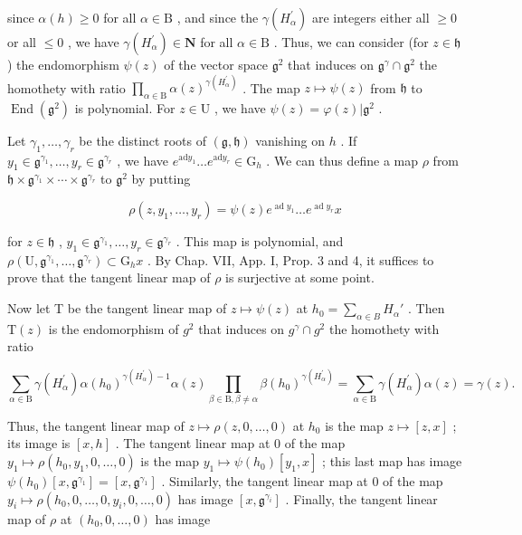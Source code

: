 since \(\alpha(h) \geq 0\) for all \(\alpha \in \mathrm{B}\) , and since the \(\gamma(H_{\alpha}^{\prime})\) are integers either all \(\geq 0\) or all \(\leq 0\) , we have \(\gamma(H_{\alpha}^{\prime}) \in \mathbf{N}\) for all \(\alpha \in \mathrm{B}\) . Thus, we can consider (for \(z \in \mathfrak{h}\) ) the endomorphism \(\psi(z)\) of the vector space \(\mathfrak{g}^2\) that induces on \(\mathfrak{g}^{\gamma} \cap \mathfrak{g}^2\) the homothety with ratio \(\prod_{\alpha \in \mathrm{B}} \alpha(z)^{\gamma(H_{\alpha}^{\prime})}\) . The map \(z \mapsto \psi(z)\) from \(\mathfrak{h}\) to \(\operatorname{End}(\mathfrak{g}^2)\) is polynomial. For \(z \in \mathrm{U}\) , we have \(\psi(z) = \varphi(z)|\mathfrak{g}^2\) .

Let \(\gamma_1, \ldots, \gamma_r\) be the distinct roots of \((\mathfrak{g}, \mathfrak{h})\) vanishing on \(h\) . If \(y_1 \in \mathfrak{g}^{\gamma_1}, \ldots, y_r \in \mathfrak{g}^{\gamma_r}\) , we have \(e^{\mathrm{ad} y_1} \ldots e^{\mathrm{ad} y_r} \in \mathrm{G}_h\) . We can thus define a map \(\rho\) from \(\mathfrak{h} \times \mathfrak{g}^{\gamma_1} \times \cdots \times \mathfrak{g}^{\gamma_r}\) to \(\mathfrak{g}^2\) by putting

\[
\rho (z, y _ {1}, \dots , y _ {r}) = \psi (z) e ^ {\operatorname{ad} y _ {1}} \dots e ^ {\operatorname{ad} y _ {r}} x
\]

for \(z \in \mathfrak{h}\) , \(y_1 \in \mathfrak{g}^{\gamma_1}, \ldots, y_r \in \mathfrak{g}^{\gamma_r}\) . This map is polynomial, and \(\rho(\mathrm{U}, \mathfrak{g}^{\gamma_1}, \ldots, \mathfrak{g}^{\gamma_r}) \subset \mathrm{G}_h x\) . By Chap. VII, App. I, Prop. 3 and 4, it suffices to prove that the tangent linear map of \(\rho\) is surjective at some point.

Now let T be the tangent linear map of \(z \mapsto \psi(z)\) at \(h_{0} = \sum_{\alpha \in B} H_{\alpha}'\) . Then \(\mathrm{T}(z)\) is the endomorphism of \(g^{2}\) that induces on \(g^{\gamma} \cap g^{2}\) the homothety with ratio

\[
\sum_ {\alpha \in \mathrm{B}} \gamma (H _ {\alpha} ^ {\prime}) \alpha (h _ {0}) ^ {\gamma (H _ {\alpha} ^ {\prime}) - 1} \alpha (z) \prod_ {\beta \in \mathrm{B}, \beta \neq \alpha} \beta (h _ {0}) ^ {\gamma (H _ {\alpha} ^ {\prime})} = \sum_ {\alpha \in \mathrm{B}} \gamma (H _ {\alpha} ^ {\prime}) \alpha (z) = \gamma (z).
\]

Thus, the tangent linear map of \(z \mapsto \rho(z,0,\ldots,0)\) at \(h_{0}\) is the map \(z \mapsto [z,x]\) ; its image is \([x,h]\) . The tangent linear map at 0 of the map \(y_{1} \mapsto \rho(h_{0},y_{1},0,\ldots,0)\) is the map \(y_{1} \mapsto \psi(h_{0})[y_{1},x]\) ; this last map has image \(\psi(h_{0})[x,\mathfrak{g}^{\gamma_{1}}] = [x,\mathfrak{g}^{\gamma_{1}}]\) . Similarly, the tangent linear map at 0 of the map \(y_{i} \mapsto \rho(h_{0},0,\ldots,0,y_{i},0,\ldots,0)\) has image \([x,\mathfrak{g}^{\gamma_{i}}]\) . Finally, the tangent linear map of \(\rho\) at \((h_{0},0,\ldots,0)\) has image

